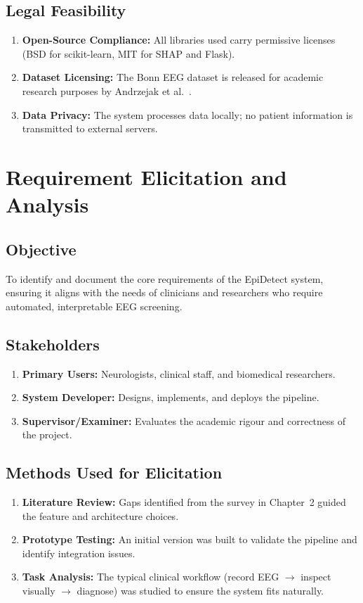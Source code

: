 \subsection{Legal Feasibility}
\begin{enumerate}
    \item \textbf{Open-Source Compliance:} All libraries used carry permissive licenses (BSD for scikit-learn, MIT for SHAP and Flask).
    \item \textbf{Dataset Licensing:} The Bonn EEG dataset is released for academic research purposes by Andrzejak et al.~\citep{andrzejak2001indications}.
    \item \textbf{Data Privacy:} The system processes data locally; no patient information is transmitted to external servers.
\end{enumerate}

\section{Requirement Elicitation and Analysis}

\subsection{Objective}
To identify and document the core requirements of the EpiDetect system, ensuring it aligns with the needs of clinicians and researchers who require automated, interpretable EEG screening.

\subsection{Stakeholders}
\begin{enumerate}
    \item \textbf{Primary Users:} Neurologists, clinical staff, and biomedical researchers.
    \item \textbf{System Developer:} Designs, implements, and deploys the pipeline.
    \item \textbf{Supervisor/Examiner:} Evaluates the academic rigour and correctness of the project.
\end{enumerate}

\subsection{Methods Used for Elicitation}
\begin{enumerate}
    \item \textbf{Literature Review:} Gaps identified from the survey in Chapter~2 guided the feature and architecture choices.
    \item \textbf{Prototype Testing:} An initial version was built to validate the pipeline and identify integration issues.
    \item \textbf{Task Analysis:} The typical clinical workflow (record EEG $\rightarrow$ inspect visually $\rightarrow$ diagnose) was studied to ensure the system fits naturally.
\end{enumerate}

